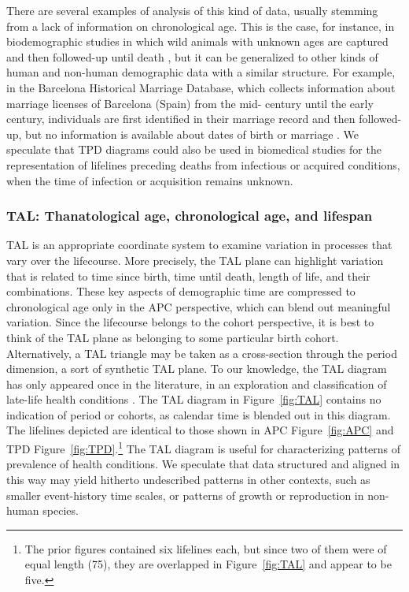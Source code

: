 \documentclass[12pt,oneside,a4paper]{article} %
\newcommand\tgh[1]{\raisebox{-.25\height}{\texttt{[image: Figures/triadtable/triad\#1.pdf]}}}
\begin{document}
There are several examples of analysis of this kind of
data, usually stemming from a lack of information on chronological age. This is
the case, for instance, in biodemographic studies in which wild animals with unknown
ages are captured and then followed-up until death
\citep{Muller2004,Muller2007}, but it can be generalized to other kinds of human
and non-human demographic data with a similar structure. For example, in the
Barcelona Historical Marriage Database, which collects information about
marriage licenses of Barcelona (Spain) from the mid- century until the
early  century, individuals are first identified in their marriage
record and then followed-up, but no information is available about dates of
birth or marriage \citep{villavicencio2015lifespans}.
We speculate that TPD diagrams could also be used in biomedical studies
for the representation of lifelines preceding deaths from infectious or acquired conditions, when the time of infection or acquisition remains unknown.


\FloatBarrier
\subsubsection{TAL: Thanatological age, chronological age, and
lifespan}%
\FloatBarrier  
TAL is an appropriate coordinate
system to examine variation in processes that vary over the lifecourse.
More precisely, the TAL plane can highlight variation that is related to time
since birth, time until death, length of life, and their combinations. These
key aspects of demographic time are compressed to chronological age only in the
APC perspective, which can blend out meaningful variation. Since the lifecourse belongs to the cohort perspective, it is best to think of the TAL plane as belonging to some particular birth cohort. Alternatively, a TAL triangle may be taken as a cross-section through the period dimension, a sort of synthetic TAL plane. To our knowledge, the TAL diagram has only appeared once in the literature, in an exploration and classification of late-life health
conditions \citep{riffe2015ttd}. The TAL diagram in Figure~\ref{fig:TAL} contains
no indication of period or cohorts, as calendar time is blended out in this
diagram.
The lifelines depicted are identical to those shown in APC Figure~\ref{fig:APC} and TPD Figure~\ref{fig:TPD}.\footnote{The prior figures contained six lifelines each, but since two of them were of equal length (75), they are overlapped in
Figure~\ref{fig:TAL} and appear to be five.} The TAL diagram is useful for
characterizing patterns of prevalence of health conditions. We speculate
that data structured and aligned in this way may yield hitherto undescribed
patterns in other contexts, such as smaller event-history time scales, or
patterns of growth or reproduction in non-human species.
\end{document}
